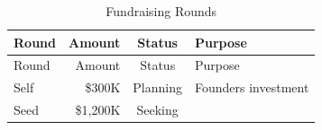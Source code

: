 \documentclass[11pt,openany]{book}
\begin{document}
\begin{longtable}[]{@{}lrcl@{}}
\caption{Fundraising Rounds}\tabularnewline
\toprule
\begin{minipage}[b]{0.13\columnwidth}\raggedright
Round\strut
\end{minipage} & \begin{minipage}[b]{0.10\columnwidth}\raggedleft
Amount\strut
\end{minipage} & \begin{minipage}[b]{0.10\columnwidth}\centering
Status\strut
\end{minipage} & \begin{minipage}[b]{0.55\columnwidth}\raggedright
Purpose\strut
\end{minipage}\tabularnewline
\midrule
\endfirsthead
\toprule
\begin{minipage}[b]{0.13\columnwidth}\raggedright
Round\strut
\end{minipage} & \begin{minipage}[b]{0.10\columnwidth}\raggedleft
Amount\strut
\end{minipage} & \begin{minipage}[b]{0.10\columnwidth}\centering
Status\strut
\end{minipage} & \begin{minipage}[b]{0.55\columnwidth}\raggedright
Purpose\strut
\end{minipage}\tabularnewline
\midrule
\endhead
\begin{minipage}[t]{0.13\columnwidth}\raggedright
Self\strut
\end{minipage} & \begin{minipage}[t]{0.10\columnwidth}\raggedleft
\$300K\strut
\end{minipage} & \begin{minipage}[t]{0.10\columnwidth}\centering
Planning\strut
\end{minipage} & \begin{minipage}[t]{0.55\columnwidth}\raggedright
Founders investment\strut
\end{minipage}\tabularnewline
\begin{minipage}[t]{0.13\columnwidth}\raggedright
Seed\strut
\end{minipage} & \begin{minipage}[t]{0.10\columnwidth}\raggedleft
\$1,200K\strut
\end{minipage} & \begin{minipage}[t]{0.10\columnwidth}\centering
Seeking\strut
\end{minipage} & \begin{minipage}[t]{0.55\columnwidth}\raggedright

\end{minipage}
\end{longtable}
\end{document}
